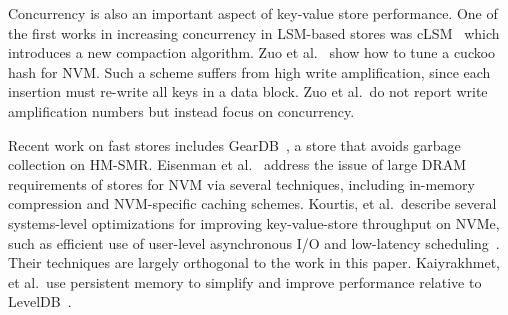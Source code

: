 Concurrency is also an important aspect of key-value store performance. One of
the first works in increasing concurrency in LSM-based stores was
cLSM~\cite{DBLP:conf/eurosys/Golan-GuetaBHK15} which introduces a new
compaction algorithm.  Zuo et al.~\cite{DBLP:journals/tos/ZuoHW19} show how to
tune a cuckoo hash for NVM.  Such a scheme suffers from high write
amplification, since each insertion must re-write all keys in a data block.
Zuo et al.~do not report write amplification numbers but instead focus on
concurrency.

Recent work on fast \kv stores includes
GearDB~\cite{DBLP:conf/fast/YaoWHZLXH19}, a \kv store that avoids garbage
collection on HM-SMR.  Eisenman et
al.~\cite{DBLP:conf/eurosys/EisenmanGAADHPC18} address the issue of large DRAM
requirements of \kv stores for NVM via several techniques, including in-memory
compression and NVM-specific caching schemes.  Kourtis, et al.~describe several
systems-level optimizations for improving key-value-store throughput on NVMe,
such as efficient use of user-level asynchronous I/O and low-latency
scheduling~\cite{DBLP:conf/fast/KourtisIK19}.  Their techniques are largely
orthogonal to the work in this paper.  Kaiyrakhmet, et al.~use
persistent memory to simplify and improve performance relative to
LevelDB~\cite{DBLP:conf/fast/KaiyrakhmetLNNC19}.

